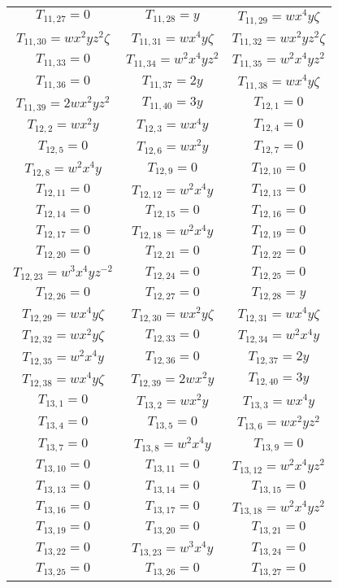 \documentclass[12pt]{memoireuqam1.3}
\begin{document}
\begin{longtable}{|c|c|c|}
$T_{11,27}= 0$&
$T_{11,28}= y$&
$T_{11,29}= wx^4y\zeta$\\
$T_{11,30}= wx^2yz^2\zeta$&
$T_{11,31}= wx^4y\zeta$&
$T_{11,32}= wx^2yz^2\zeta$\\
$T_{11,33}= 0$&
$T_{11,34}= w^2x^4yz^2$&
$T_{11,35}= w^2x^4yz^2$\\
$T_{11,36}= 0$&
$T_{11,37}= 2y$&
$T_{11,38}= wx^4y\zeta$\\
$T_{11,39}= 2wx^2yz^2$&
$T_{11,40}= 3y$&
$T_{12,1}= 0$\\
$T_{12,2}= wx^2y$&
$T_{12,3}= wx^4y$&
$T_{12,4}= 0$\\
$T_{12,5}= 0$&
$T_{12,6}= wx^2y$&
$T_{12,7}= 0$\\
$T_{12,8}= w^2x^4y$&
$T_{12,9}= 0$&
$T_{12,10}= 0$\\
$T_{12,11}= 0$&
$T_{12,12}= w^2x^4y$&
$T_{12,13}= 0$\\
$T_{12,14}= 0$&
$T_{12,15}= 0$&
$T_{12,16}= 0$\\
$T_{12,17}= 0$&
$T_{12,18}= w^2x^4y$&
$T_{12,19}= 0$\\
$T_{12,20}= 0$&
$T_{12,21}= 0$&
$T_{12,22}= 0$\\
$T_{12,23}= w^3x^4yz^{-2}$&
$T_{12,24}= 0$&
$T_{12,25}= 0$\\
$T_{12,26}= 0$&
$T_{12,27}= 0$&
$T_{12,28}= y$\\
$T_{12,29}= wx^4y\zeta$&
$T_{12,30}= wx^2y\zeta$&
$T_{12,31}= wx^4y\zeta$\\
$T_{12,32}= wx^2y\zeta$&
$T_{12,33}= 0$&
$T_{12,34}= w^2x^4y$\\
$T_{12,35}= w^2x^4y$&
$T_{12,36}= 0$&
$T_{12,37}= 2y$\\
$T_{12,38}= wx^4y\zeta$&
$T_{12,39}= 2wx^2y$&
$T_{12,40}= 3y$\\
$T_{13,1}= 0$&
$T_{13,2}= wx^2y$&
$T_{13,3}= wx^4y$\\
$T_{13,4}= 0$&
$T_{13,5}= 0$&
$T_{13,6}= wx^2yz^2$\\
$T_{13,7}= 0$&
$T_{13,8}= w^2x^4y$&
$T_{13,9}= 0$\\
$T_{13,10}= 0$&
$T_{13,11}= 0$&
$T_{13,12}= w^2x^4yz^2$\\
$T_{13,13}= 0$&
$T_{13,14}= 0$&
$T_{13,15}= 0$\\
$T_{13,16}= 0$&
$T_{13,17}= 0$&
$T_{13,18}= w^2x^4yz^2$\\
$T_{13,19}= 0$&
$T_{13,20}= 0$&
$T_{13,21}= 0$\\
$T_{13,22}= 0$&
$T_{13,23}= w^3x^4y$&
$T_{13,24}= 0$\\
$T_{13,25}= 0$&
$T_{13,26}= 0$&
$T_{13,27}= 0$\\

\end{longtable}
\end{document}
